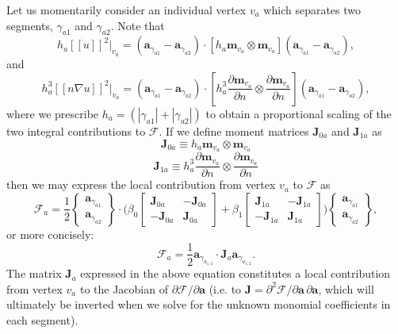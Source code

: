 \documentclass[12pt]{article}
\begin{document}
Let us momentarily consider an individual vertex $v_a$ which separates two segments, $\gamma_{a1}$ and $\gamma_{a2}$. Note that
\begin{equation}
        h_a [\![ u ]\!]^2 \bigg|_{v_a} = (\mathbf{a}_{\gamma_{a1}} - \mathbf{a}_{\gamma_{a2}}) \cdot \left[ h_a \mathbf{m}_{v_a} \otimes \mathbf{m}_{v_a} \right] (\mathbf{a}_{\gamma_{a1}} - \mathbf{a}_{\gamma_{a2}}),
\end{equation}
and
\begin{equation}
        h_a^3 [\![ n \nabla u ]\!]^2 \bigg|_{v_a} = (\mathbf{a}_{\gamma_{a1}} - \mathbf{a}_{\gamma_{a2}}) \cdot \left[ h_a^3 \frac{\partial \mathbf{m}_{v_a}}{\partial n} \otimes \frac{\partial \mathbf{m}_{v_a}}{\partial n} \right] (\mathbf{a}_{\gamma_{a1}} - \mathbf{a}_{\gamma_{a2}}),
\end{equation}
where we prescribe $h_a = (|\gamma_{a1}| + |\gamma_{a2}|)$ to obtain a proportional scaling of the two integral contributions to $\mathcal{F}$. If we define moment matrices $\mathbf{J}_{0a}$ and $\mathbf{J}_{1a}$ as
\begin{equation}
        \mathbf{J}_{0a} \equiv h_a \mathbf{m}_{v_a} \otimes \mathbf{m}_{v_a}
\end{equation}
\begin{equation}
        \mathbf{J}_{1a} \equiv h_a^3 \frac{\partial \mathbf{m}_{v_a}}{\partial n} \otimes \frac{\partial \mathbf{m}_{v_a}}{\partial n}
\end{equation}
then we may express the local contribution from vertex $v_a$ to $\mathcal{F}$ as
\begin{equation}
        \mathcal{F}_a = \frac{1}{2} \left\{ \begin{array}{c} \mathbf{a}_{\gamma_{a1}} \\ \mathbf{a}_{\gamma_{a2}} \end{array} \right\} \cdot \bigg( \beta_0 \left[ \begin{array}{cc} \mathbf{J}_{0a} & - \mathbf{J}_{0a} \\ - \mathbf{J}_{0a} & \mathbf{J}_{0a} \end{array} \right] + \beta_1 \left[ \begin{array}{cc} \mathbf{J}_{1a} & - \mathbf{J}_{1a} \\ - \mathbf{J}_{1a} & \mathbf{J}_{1a} \end{array} \right] \bigg) \left\{ \begin{array}{c} \mathbf{a}_{\gamma_{a1}} \\ \mathbf{a}_{\gamma_{a2}} \end{array} \right\},
\end{equation}
or more concisely:
\begin{equation}
        \mathcal{F}_a = \frac{1}{2} \mathbf{a}_{\gamma_{a_{1,2}}} \cdot \mathbf{J}_a \mathbf{a}_{\gamma_{a_{1,2}}}.
\end{equation}
The matrix $\mathbf{J}_a$ expressed in the above equation constitutes a local contribution from vertex $v_a$ to the Jacobian of $\partial \mathcal{F} / \partial \mathbf{a}$ (i.e. to $\mathbf{J} = \partial^2 \mathcal{F} / \partial \mathbf{a} \, \partial \mathbf{a}$, which will ultimately be inverted when we solve for the unknown monomial coefficients in each segment).
\end{document}
